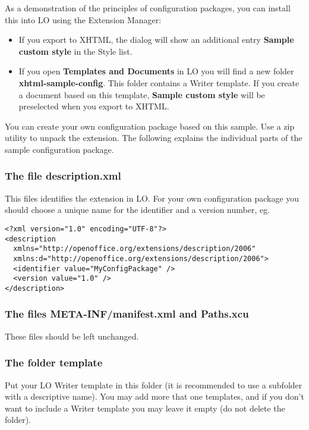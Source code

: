 \documentclass{article}
\newcommand\liststyleLviii{%
\renewcommand\labelitemi{${\bullet}$}
\renewcommand\labelitemii{${\circ}$}
\renewcommand\labelitemiii{${\blacksquare}$}
\renewcommand\labelitemiv{${\bullet}$}
}
\begin{document}
{\mdseries
As a demonstration of the principles of configuration packages, you can install this into LO using the Extension Manager:}

\liststyleLviii
\begin{itemize}
\item If you export to XHTML, the dialog will show an additional entry \textbf{Sample custom style} in the Style list.
\item If you open \textbf{Templates and Documents} in LO you will find a new folder \textbf{xhtml-sample-config}. This folder contains a Writer template. If you create a document based on this template, \textbf{Sample custom style} will be preselected when you export to XHTML.
\end{itemize}
{\mdseries
You can create your own configuration package based on this sample. Use a zip utility to unpack the extension. The following explains the individual parts of the sample configuration package.}

\subsubsection{The file description.xml}
{\mdseries
This files identifies the extension in LO. For your own configuration package you should choose a unique name for the identifier and a version number, eg.}

\begin{verbatim}
<?xml version="1.0" encoding="UTF-8"?>
<description
  xmlns="http://openoffice.org/extensions/description/2006"
  xmlns:d="http://openoffice.org/extensions/description/2006">
  <identifier value="MyConfigPackage" />
  <version value="1.0" />
</description> 
\end{verbatim}
\subsubsection{The files META-INF/manifest.xml and Paths.xcu}
{\mdseries
These files should be left unchanged.}

\subsubsection{The folder template}
{\mdseries
Put your LO Writer template in this folder (it is recommended to use a subfolder with a descriptive name). You may add more that one templates, and if you don't want to include a Writer template you may leave it empty (do not delete the folder).}
\end{document}
